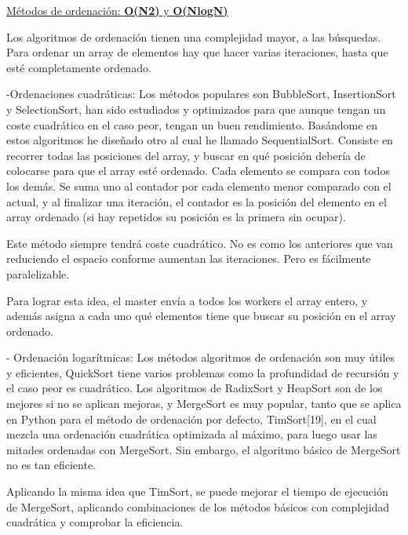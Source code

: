 \begin{flushleft}
	\underline{Métodos de ordenación: \textbf{O(N2)} y \textbf{O(NlogN)}}
\end{flushleft}
Los algoritmos de ordenación tienen una complejidad mayor, a las búsquedas. Para ordenar un array de elementos hay que hacer varias iteraciones, hasta que esté completamente ordenado.

-Ordenaciones cuadráticas:
Los métodos populares son BubbleSort, InsertionSort y SelectionSort, han sido estudiados y optimizados para que aunque tengan un coste cuadrático en el caso peor, tengan un buen rendimiento. Basándome en estos algoritmos he diseñado otro al cual he llamado SequentialSort. Consiste en recorrer todas las posiciones del array, y buscar en qué posición debería de colocarse para que el array esté ordenado. Cada elemento se compara con todos los demás. Se suma uno al contador por cada elemento menor comparado con el actual, y al finalizar una iteración, el contador es la posición del elemento en el array ordenado (si hay repetidos su posición es la primera sin ocupar).


Este método siempre tendrá coste cuadrático. No es como los anteriores que van reduciendo el espacio conforme aumentan las iteraciones. Pero es fácilmente paralelizable. 

Para lograr esta idea, el master envía a todos los workers el array entero, y además asigna a cada uno qué elementos tiene que buscar su posición en el array ordenado.


- Ordenación logarítmicas:
Los métodos algoritmos de ordenación son muy útiles y eficientes, QuickSort tiene varios problemas como la profundidad de recursión y el caso peor es cuadrático. Los algoritmos de RadixSort y HeapSort son de los mejores si no se aplican mejoras,  y MergeSort es muy popular, tanto que se aplica en Python para el método de ordenación por defecto, TimSort[19], en el cual mezcla una ordenación cuadrática optimizada al máximo, para luego usar las mitades ordenadas con MergeSort. Sin embargo, el algoritmo básico de MergeSort no es tan eficiente.

Aplicando la misma idea que TimSort, se puede mejorar el tiempo de ejecución de MergeSort, aplicando combinaciones de los métodos básicos con complejidad cuadrática y comprobar la eficiencia.

